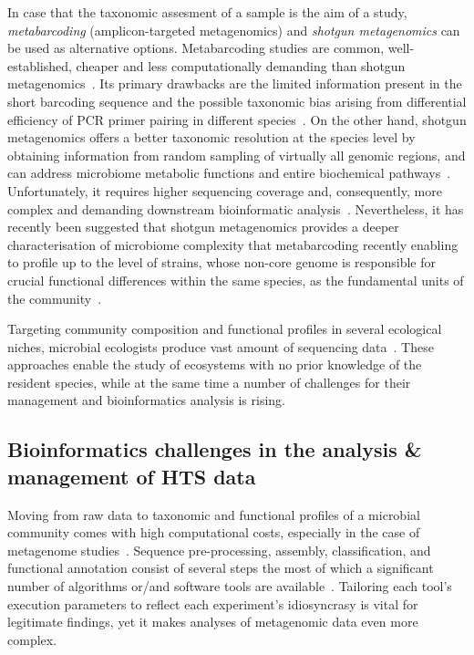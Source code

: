       In case that the taxonomic assesment of a sample is the aim of a study, 
      \textit{metabarcoding} (amplicon-targeted metagenomics) and \textit{shotgun metagenomics} can be used as alternative options. 
      Metabarcoding studies are common, well-established, cheaper and less computationally demanding than shotgun metagenomics~\cite{bell2021comparing}. 
      Its primary drawbacks are the limited information present in the short barcoding sequence and the possible taxonomic bias arising from differential efficiency of PCR primer pairing in different species~\cite{blazewicz2013evaluating}. 
      On the other hand, shotgun metagenomics offers a better taxonomic resolution at the species level by obtaining information from random sampling of virtually all genomic regions, and can address microbiome metabolic functions and entire biochemical pathways~\cite{sharpton2014introduction}. 
      Unfortunately, it requires higher sequencing coverage and, consequently, more complex and demanding downstream bioinformatic analysis~\cite{laudadio2018quantitative}. 
      Nevertheless, it has recently been suggested that shotgun metagenomics provides a deeper characterisation of microbiome complexity that metabarcoding recently enabling to profile up to the level of strains, whose non-core genome is responsible for crucial functional differences within the same species, as the fundamental units of the community~\cite{davila2019review, clooney2016comparing, segata2018road}.       
      
      Targeting community composition and functional profiles in several ecological niches, 
      microbial ecologists produce vast 
      amount of sequencing data~\cite{harrison2021european}.
      These approaches enable the study of ecosystems with no prior knowledge of the resident species, 
      while at the same time a number of challenges for their management and bioinformatics analysis is rising. 
   \subsection{Bioinformatics challenges in the analysis \& management of HTS data}
   \label{subsec:hts_chal}

      Moving from raw data to taxonomic and functional profiles of a microbial community comes with high computational costs, especially in the case of metagenome studies~\cite{yang2021review}.
      Sequence pre-processing, assembly, classification, and functional annotation consist of several steps the most of which a significant number of algorithms or/and software tools are available~\cite{breitwieser2019review, roumpeka2017review}. 
      Tailoring each tool's execution parameters to reflect each experiment's idiosyncrasy is vital for legitimate findings, yet it makes analyses of metagenomic data even more complex. 

